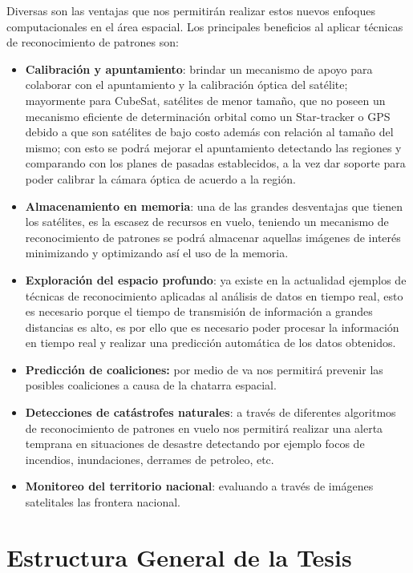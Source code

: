 Diversas son las ventajas que nos permitirán realizar estos nuevos enfoques computacionales en el área espacial. Los principales beneficios al aplicar técnicas de reconocimiento de patrones son: 
\begin{itemize}
\item \textbf{Calibración y apuntamiento}: brindar un mecanismo de apoyo para colaborar con el apuntamiento y la calibración óptica del satélite; mayormente para CubeSat, satélites de menor tamaño, que no poseen un mecanismo eficiente de determinación orbital como un Star-tracker o GPS debido a que son satélites de bajo costo además con relación al tamaño del mismo; con esto se podrá mejorar el apuntamiento detectando las regiones y comparando con los planes de pasadas  establecidos, a la vez dar soporte para poder calibrar la cámara óptica de acuerdo a la región.
\item \textbf{Almacenamiento en memoria}: una de las grandes desventajas que tienen los satélites, es la escasez de recursos en vuelo, teniendo un mecanismo de reconocimiento de patrones se podrá almacenar aquellas imágenes de interés minimizando y optimizando  así el uso de la memoria.
\item \textbf{Exploración del espacio profundo}: ya existe en la actualidad ejemplos de técnicas de reconocimiento aplicadas al análisis de datos en tiempo real, esto es necesario  porque el tiempo de transmisión de información a grandes distancias es alto, es por ello que es necesario poder procesar la información en tiempo real y realizar una predicción automática de los datos obtenidos.
\item \textbf{Predicción de coaliciones:} por medio de \ac{va} nos permitirá prevenir las posibles coaliciones a causa de la chatarra espacial. 
\item \textbf{Detecciones de catástrofes naturales}: a través de diferentes algoritmos de reconocimiento de patrones en vuelo nos permitirá realizar una alerta temprana en situaciones de desastre detectando por ejemplo focos de incendios, inundaciones, derrames de petroleo, etc.
\item \textbf{Monitoreo del territorio nacional}: evaluando a través de imágenes satelitales las frontera nacional.
\end{itemize}

\section{Estructura General de la Tesis }\label{sec:estructura}

